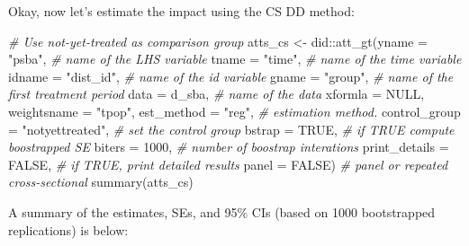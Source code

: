 \documentclass[
]{article}
\newenvironment{Shaded}{\begin{snugshade}}{\end{snugshade}}
\newcommand{\AttributeTok}[1]{\textcolor[rgb]{0.77,0.63,0.00}{#1}}
\newcommand{\CommentTok}[1]{\textcolor[rgb]{0.56,0.35,0.01}{\textit{#1}}}
\newcommand{\ConstantTok}[1]{\textcolor[rgb]{0.00,0.00,0.00}{#1}}
\newcommand{\DecValTok}[1]{\textcolor[rgb]{0.00,0.00,0.81}{#1}}
\newcommand{\FunctionTok}[1]{\textcolor[rgb]{0.00,0.00,0.00}{#1}}
\newcommand{\NormalTok}[1]{#1}
\newcommand{\OtherTok}[1]{\textcolor[rgb]{0.56,0.35,0.01}{#1}}
\newcommand{\SpecialCharTok}[1]{\textcolor[rgb]{0.00,0.00,0.00}{#1}}
\newcommand{\StringTok}[1]{\textcolor[rgb]{0.31,0.60,0.02}{#1}}
\begin{document}
Okay, now let's estimate the impact using the CS DD method:

\begin{Shaded}
\begin{Highlighting}[]
\CommentTok{\# Use not{-}yet{-}treated as comparison group}
\NormalTok{atts\_cs }\OtherTok{\textless{}{-}}\NormalTok{ did}\SpecialCharTok{::}\FunctionTok{att\_gt}\NormalTok{(}\AttributeTok{yname =} \StringTok{"psba"}\NormalTok{, }\CommentTok{\# name of the LHS variable}
                       \AttributeTok{tname =} \StringTok{"time"}\NormalTok{, }\CommentTok{\# name of the time variable}
                       \AttributeTok{idname =} \StringTok{"dist\_id"}\NormalTok{, }\CommentTok{\# name of the id variable}
                       \AttributeTok{gname =} \StringTok{"group"}\NormalTok{, }\CommentTok{\# name of the first treatment period}
                       \AttributeTok{data =}\NormalTok{ d\_sba, }\CommentTok{\# name of the data}
                       \AttributeTok{xformla =} \ConstantTok{NULL}\NormalTok{,}
                       \AttributeTok{weightsname =} \StringTok{"tpop"}\NormalTok{,}
                       \AttributeTok{est\_method =} \StringTok{"reg"}\NormalTok{, }\CommentTok{\# estimation method.}
                       \AttributeTok{control\_group =} \StringTok{"notyettreated"}\NormalTok{, }\CommentTok{\# set the control group}
                       \AttributeTok{bstrap =} \ConstantTok{TRUE}\NormalTok{, }\CommentTok{\# if TRUE compute boostrapped SE}
                       \AttributeTok{biters =} \DecValTok{1000}\NormalTok{, }\CommentTok{\# number of boostrap interations}
                       \AttributeTok{print\_details =} \ConstantTok{FALSE}\NormalTok{, }\CommentTok{\# if TRUE, print detailed results}
                       \AttributeTok{panel =} \ConstantTok{FALSE}\NormalTok{) }\CommentTok{\# panel or repeated cross{-}sectional}
\FunctionTok{summary}\NormalTok{(atts\_cs)}
\end{Highlighting}
\end{Shaded}

A summary of the estimates, SEs, and 95\% CIs (based on 1000
bootstrapped replications) is below:
\end{document}
